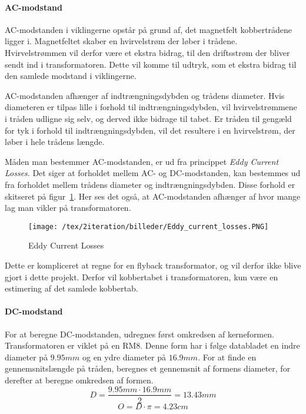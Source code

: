 \paragraph{AC-modstand}
AC-modstanden i viklingerne opstår på grund af, det magnetfelt kobbertrådene ligger i. Magnetfeltet skaber en hvirvelstrøm der løber i trådene. Hvirvelstrømmen vil derfor være et ekstra bidrag, til den driftsstrøm der bliver sendt ind i transformatoren. Dette vil komme til udtryk, som et ekstra bidrag til den samlede modstand i viklingerne. 

AC-modstanden afhænger af indtrængningsdybden og trådens diameter. Hvis diameteren er tilpas lille i forhold til indtrængningsdybden, vil  hvirvelstrømmene i tråden udligne sig selv, og derved ikke bidrage til tabet. Er tråden til gengæld for tyk i forhold til indtrængningsdybden, vil det resultere i en hvirvelstrøm, der løber i hele trådens længde. 

Måden man bestemmer AC-modstanden, er ud fra princippet \textit{Eddy Current Losses}. Det siger at forholdet mellem AC- og DC-modstanden, kan bestemmes ud fra forholdet mellem trådens diameter og indtrængningsdybden. Disse forhold er skitseret på figur~\ref{fig:Eddy_current_losses}\cite{eddy_current_losses}. Her ses det også, at AC-modstanden afhænger af hvor mange lag man vikler på transformatoren. 

\begin{figure}[H]
	\center
	\texttt{[image: /tex/2iteration/billeder/Eddy\_current\_losses.PNG]}
	\caption{Eddy Current Losses}
	\label{fig:Eddy_current_losses}
\end{figure}

Dette er kompliceret at regne for en flyback transformator, og vil derfor ikke blive gjort i dette projekt. Derfor vil kobbertabet i transformatoren, kun være en estimering af det samlede kobbertab.

\paragraph{DC-modstand}
For at beregne DC-modstanden, udregnes først omkredsen af kerneformen. Transformatoren er viklet på en RM8. Denne form har i følge databladet en indre diameter på $9.95mm$ og en ydre diameter på $16.9mm$. For at finde en gennemsnitslængde på tråden, beregnes et gennemsnit af formens diameter, for derefter at beregne omkredsen af formen.
\begin{equation} \label{Diameter}
D = \frac{9.95mm \cdot 16.9mm}{2} = 13.43mm
\end{equation}
\begin{equation} \label{Omkreds}
O = D \cdot \pi = 4.23cm
\end{equation}

